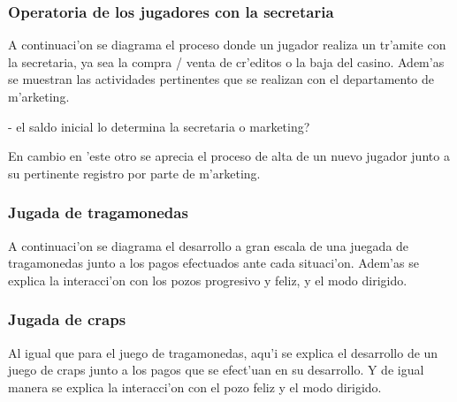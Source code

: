 \subsubsection{Operatoria de los jugadores con la secretaria}
A continuaci'on se diagrama el proceso donde un jugador realiza un tr'amite con la secretaria, ya sea la compra / venta de cr'editos o la baja del casino. Adem'as se muestran las actividades pertinentes que se realizan con el departamento de m'arketing. 

- el saldo inicial lo determina la secretaria o marketing?


\clearpage

En cambio en 'este otro se aprecia el proceso de alta de un nuevo jugador junto a su pertinente registro por parte de m'arketing.



\clearpage




\subsubsection{Jugada de tragamonedas}
A continuaci'on se diagrama el desarrollo a gran escala de una juegada de tragamonedas junto a los pagos efectuados ante cada situaci'on. Adem'as se explica la interacci'on con los pozos progresivo y feliz, y el modo dirigido.


\clearpage





\subsubsection{Jugada de craps}
Al igual que para el juego de tragamonedas, aqu'i se explica el desarrollo de un juego de craps junto a los pagos que se efect'uan en su desarrollo. Y de igual manera se explica la interacci'on con el pozo feliz y el modo dirigido.


\clearpage





